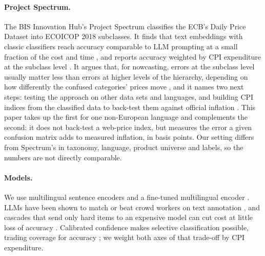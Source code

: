 \paragraph{Project Spectrum.} The BIS Innovation Hub's Project Spectrum
\citep{bis2026spectrum} classifies the ECB's Daily Price Dataset into ECOICOP 2018
subclasses. It finds that text embeddings with classic classifiers reach accuracy comparable
to LLM prompting at a small fraction of the cost and time \citep[p.~3]{bis2026spectrum}, and
reports accuracy weighted by CPI expenditure at the subclass level
\citep[pp.~22--24]{bis2026spectrum}. It argues that, for nowcasting, errors at the subclass
level usually matter less than errors at higher levels of the hierarchy, depending on how
differently the confused categories' prices move \citep[p.~25]{bis2026spectrum}, and it names
two next steps: testing the approach on other data sets and languages, and building CPI
indices from the classified data to back-test them against official inflation
\citep[p.~30]{bis2026spectrum}. This paper takes up the first for one non-European language and
complements the second: it does not back-test a web-price index, but measures the error a
given confusion matrix adds to measured inflation, in basis points. Our setting differs from Spectrum's in taxonomy, language,
product universe and labels, so the numbers are not directly comparable.

\paragraph{Models.} We use multilingual sentence encoders \citep{reimers2019sbert,
wang2024me5, chen2024bgem3} and a fine-tuned multilingual encoder \citep{conneau2020xlmr}.
LLMs have been shown to match or beat crowd workers on text annotation
\citep{gilardi2023chatgpt}, and cascades that send only hard items to an expensive model can
cut cost at little loss of accuracy \citep{chen2023frugalgpt}. Calibrated confidence
\citep{guo2017calibration} makes selective classification possible, trading coverage for
accuracy \citep{geifman2017selective}; we weight both axes of that trade-off by CPI
expenditure.
